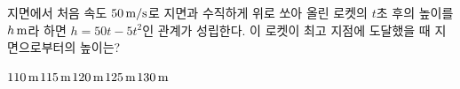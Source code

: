 지면에서 처음 속도 $50\mkern3mu \mathrm{m/s}$로 지면과 수직하게 위로 쏘아 올린 로켓의 $t$초 후의 높이를 $h\mkern3mu \mathrm{m}$라 하면 $h=50t-5t^2$인 관계가 성립한다. 이 로켓이 최고 지점에 도달했을 때 지면으로부터의 높이는?
\begin{choices32}{$110\mkern3mu \mathrm{m}$}{$115\mkern3mu \mathrm{m}$}{$120\mkern3mu \mathrm{m}$}{$125\mkern3mu \mathrm{m}$}{$130\mkern3mu \mathrm{m}$}\end{choices32}
